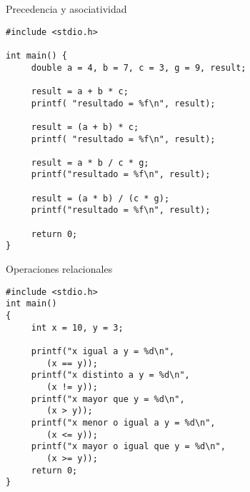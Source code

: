 \documentclass[xcolor={usenames,svgnames,dvipsnames}, aspectratio=169]{beamer}
\begin{document}
\begin{frame}[label={sec:org479c385},fragile,plain]{Precedencia y asociatividad}
 \lstset{language=C,label= ,caption= ,captionpos=b,numbers=none}
\begin{lstlisting}
#include <stdio.h>

int main() { 
     double a = 4, b = 7, c = 3, g = 9, result; 
 
     result = a + b * c; 
     printf( "resultado = %f\n", result); 

     result = (a + b) * c; 
     printf( "resultado = %f\n", result); 

     result = a * b / c * g; 
     printf("resultado = %f\n", result); 

     result = (a * b) / (c * g); 
     printf("resultado = %f\n", result); 

     return 0;
} 
\end{lstlisting}
\end{frame}

\begin{frame}[label={sec:orgb9a3c70},fragile]{Operaciones relacionales}
 \lstset{language=C,label= ,caption= ,captionpos=b,numbers=none}
\begin{lstlisting}
#include <stdio.h>
int main() 
{ 
     int x = 10, y = 3; 
     
     printf("x igual a y = %d\n", 
	    (x == y)); 
     printf("x distinto a y = %d\n",
	    (x != y));     
     printf("x mayor que y = %d\n",
	    (x > y)); 
     printf("x menor o igual a y = %d\n",
	    (x <= y)); 
     printf("x mayor o igual que y = %d\n",
	    (x >= y)); 
     return 0;   
}
\end{lstlisting}
\end{frame}
\end{document}
